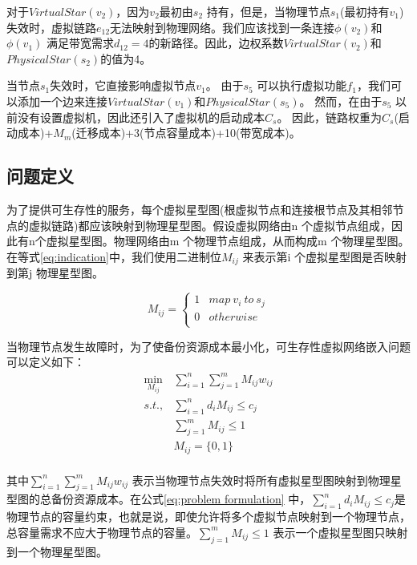 对于$VirtualStar(v_2)$，因为$v_2$最初由$s_2$ 持有，但是，当物理节点$s_1$(最初持有$v_1$)失效时，虚拟链路$e_{12}$无法映射到物理网络。我们应该找到一条连接$\phi(v_2)$和$\phi(v_1)$ 满足带宽需求$d_{12}=4$的新路径。因此，边权系数$VirtualStar(v_2)$和$PhysicalStar(s_2)$的值为4。

当节点$s_1$失效时，它直接影响虚拟节点$v_1$。 由于$s_5$ 可以执行虚拟功能$f_1$，我们可以添加一个边来连接$VirtualStar(v_1)$和$PhysicalStar(s_5)$。 然而，在由于$s_5$ 以前没有设置虚拟机，因此还引入了虚拟机的启动成本$C_s$。 因此，链路权重为$C_s$(启动成本)+$M_m$(迁移成本)+3(节点容量成本)+10(带宽成本)。

\subsection{问题定义}
为了提供可生存性的服务，每个虚拟星型图(根虚拟节点和连接根节点及其相邻节点的虚拟链路)都应该映射到物理星型图。假设虚拟网络由n 个虚拟节点组成，因此有n个虚拟星型图。物理网络由m 个物理节点组成，从而构成m 个物理星型图。在等式\ref{eq:indication}中，我们使用二进制位$M_{ij}$ 来表示第i 个虚拟星型图是否映射到第j 物理星型图。

\begin{equation}
{M_{ij}} = \left\{ {\begin{array}{*{20}{c}}
   1 & {map \ v_i \  to  \ s_j}  \\
   0 & {otherwise}  \\
\end{array}} \right.
\label{eq:indication}
\end{equation}

当物理节点发生故障时，为了使备份资源成本最小化，可生存性虚拟网络嵌入问题可以定义如下：
\begin{equation}
\begin{array}{*{20}{c}}
   {\mathop {\min }\limits_{{M_{ij}}} } & {\sum\limits_{i = 1}^n {\sum\limits_{j = 1}^m {{M_{ij}}{w_{ij}}} } }  \\
   {s.t.,} & {\sum\limits_{i = 1}^n {{d_i}{M_{ij}}}  \le {c_j}}  \\
   {} & {\sum\limits_{j = 1}^m {{M_{ij}}}  \le 1}  \\
   {} & {{M_{ij}} = \{ 0,1\} }  \\
\end{array}
\label{eq:problem formulation}
\end{equation}

其中${\sum\limits_{i = 1}^n {\sum\limits_{j = 1}^m {{M_{ij}}{w_{ij}}} } }$ 表示当物理节点失效时将所有虚拟星型图映射到物理星型图的总备份资源成本。在公式\ref{eq:problem formulation} 中，${\sum\limits_{i = 1}^n {{d_i}{M_{ij}}}  \le {c_j}}$是物理节点的容量约束，也就是说，即使允许将多个虚拟节点映射到一个物理节点，总容量需求不应大于物理节点的容量。${\sum\limits_{j = 1}^m {{M_{ij}}}  \le 1}$ 表示一个虚拟星型图只映射到一个物理星型图。

